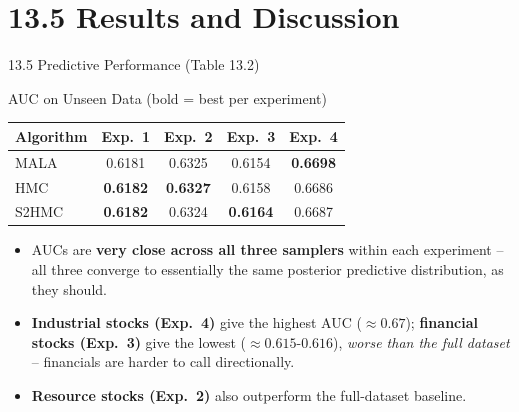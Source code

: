 \documentclass[aspectratio=169,10pt]{beamer}
\begin{document}
\section{13.5 Results and Discussion}

\begin{frame}{13.5 \; Predictive Performance (Table 13.2)}
  \begin{block}{AUC on Unseen Data (bold = best per experiment)}
    \begin{center}
    \begin{tabular}{lcccc}
      \toprule
      Algorithm & Exp.\ 1 & Exp.\ 2 & Exp.\ 3 & Exp.\ 4\\
      \midrule
      MALA  & 0.6181 & 0.6325 & 0.6154 & \textbf{0.6698}\\
      HMC   & \textbf{0.6182} & \textbf{0.6327} & 0.6158 & 0.6686\\
      S2HMC & \textbf{0.6182} & 0.6324 & \textbf{0.6164} & 0.6687\\
      \bottomrule
    \end{tabular}
    \end{center}
  \end{block}
  \begin{itemize}
    \item AUCs are \textbf{very close across all three samplers} within each
          experiment -- all three converge to essentially the same posterior
          predictive distribution, as they should.
    \item \textbf{Industrial stocks (Exp.\ 4)} give the highest AUC
          ($\approx 0.67$); \textbf{financial stocks (Exp.\ 3)} give the
          lowest ($\approx 0.615$-$0.616$), \emph{worse than the full
          dataset} -- financials are harder to call directionally.
    \item \textbf{Resource stocks (Exp.\ 2)} also outperform the full-dataset
          baseline.
  \end{itemize}
\end{frame}
\end{document}

